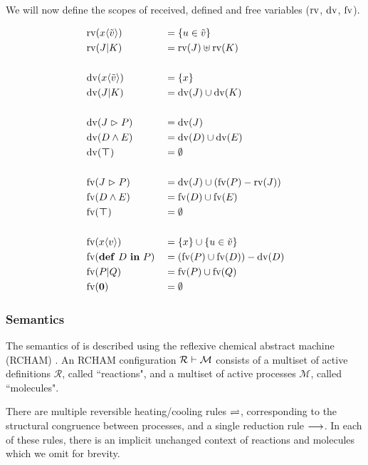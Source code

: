 We will now define the scopes of received, defined and free variables
($\operatorname{rv}$, $\operatorname{dv}$, $\operatorname{fv}$).

\begin{alignat*}{2}
  & \operatorname{rv}(x\langle\tilde{v}\rangle) & &= \{ u \in \tilde{v} \} \\
  & \operatorname{rv}(J | K)           & &= \operatorname{rv}(J) \uplus \operatorname{rv}(K) \\
  \\
  & \operatorname{dv}(x\langle\tilde{v}\rangle) & &= \{ x \} \\
  & \operatorname{dv}(J | K)           & &= \operatorname{dv}(J) \cup \operatorname{dv}(K) \\
  \\
  & \operatorname{dv}(J \vartriangleright P)         & &= \operatorname{dv}(J) \\
  & \operatorname{dv}(D \wedge E)           & &= \operatorname{dv}(D) \cup \operatorname{dv}(E) \\
  & \operatorname{dv}(\boldsymbol{\top})           & &= \emptyset \\
  \\
  & \operatorname{fv}(J \vartriangleright P)         & &= \operatorname{dv}(J) \cup (\operatorname{fv}(P) - \operatorname{rv}(J)) \\
  & \operatorname{fv}(D \wedge E)           & &= \operatorname{fv}(D) \cup \operatorname{fv}(E) \\
  & \operatorname{fv}(\boldsymbol{\top})           & &= \emptyset \\
  \\
  & \operatorname{fv}(x\langle v\rangle)         & &= \{ x \} \cup \{ u \in \tilde{v} \} \\
  & \operatorname{fv}(\textbf{\textup{def}} \ D \ \textbf{\textup{in}} \ P)         & &= (\operatorname{fv}(P) \cup \operatorname{fv}(D)) - \operatorname{dv}(D) \\
  & \operatorname{fv}(P | Q)           & &= \operatorname{fv}(P) \cup \operatorname{fv}(Q) \\
  & \operatorname{fv}(\textbf{\textup{0}})          & &= \emptyset \\
\end{alignat*}


\subsubsection{Semantics}

The semantics of \joincalc is described using the reflexive chemical abstract
machine (RCHAM) \cite{fournet_reflexive_1996}.
An RCHAM configuration
$ \rchamcnf{\mathcal{R}}{\mathcal{M}} $
consists of a multiset of active definitions $\mathcal{R}$,
called ``reactions",
and a multiset of active processes $\mathcal{M}$,
called ``molecules".

There are multiple reversible heating/cooling rules $\rightleftharpoons$,
corresponding to the structural congruence between processes,
and a single reduction rule $\longrightarrow$.
In each of these rules, there is an implicit unchanged context of reactions and
molecules which we omit for brevity.

